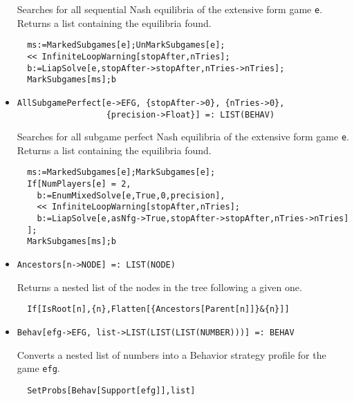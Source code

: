 \begin{itemize}
\bd 
Searches for all sequential Nash equilibria of the extensive form
game \verb+e+.  Returns a list containing the equilibria found.

\begin{verbatim}
  ms:=MarkedSubgames[e];UnMarkSubgames[e];
  << InfiniteLoopWarning[stopAfter,nTries];
  b:=LiapSolve[e,stopAfter->stopAfter,nTries->nTries];
  MarkSubgames[ms];b
\end{verbatim} 
\ed

\item{}
\protect \large \begin{verbatim}
AllSubgamePerfect[e->EFG, {stopAfter->0}, {nTries->0}, 
                  {precision->Float}] =: LIST(BEHAV) 
\end{verbatim}\normalsize

\bd 
Searches for all subgame perfect Nash equilibria of the extensive
form game \verb+e+.  Returns a list containing the equilibria found.

\begin{verbatim}
  ms:=MarkedSubgames[e];MarkSubgames[e];
  If[NumPlayers[e] = 2, 
    b:=EnumMixedSolve[e,True,0,precision],
    << InfiniteLoopWarning[stopAfter,nTries];
    b:=LiapSolve[e,asNfg->True,stopAfter->stopAfter,nTries->nTries]
  ];
  MarkSubgames[ms];b
\end{verbatim} 
\ed

\item{}
\protect \large \begin{verbatim}
Ancestors[n->NODE] =: LIST(NODE) 
\end{verbatim}\normalsize

\bd 
Returns a nested list of the nodes in the tree following a given one.  
\begin{verbatim}
  If[IsRoot[n],{n},Flatten[{Ancestors[Parent[n]]}&{n}]]
\end{verbatim} 
\ed



\item{}
\protect \large \begin{verbatim}
Behav[efg->EFG, list->LIST(LIST(LIST(NUMBER)))] =: BEHAV 
\end{verbatim}\normalsize

\bd 
Converts a nested list of numbers into a Behavior strategy
profile for the game \verb+efg+.
\begin{verbatim}
  SetProbs[Behav[Support[efg]],list]
\end{verbatim} 
\ed


\end{itemize}
